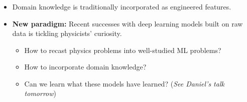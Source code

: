 \documentclass{beamer}
\begin{document}
\begin{frame}
    \frametitle{}
    \begin{itemize}
        \item Domain knowledge is traditionally incorporated as engineered features.

        \vspace{1cm}

        \item {\bf New paradigm:} Recent successes with deep learning models built on raw data is tickling physicists' curiosity.
            \begin{itemize}
                \item How to recast physics problems into well-studied ML problems?
                \item How to incorporate domain knowledge?
                \item Can we learn what these models have learned? ({\it See Daniel's talk tomorrow})
            \end{itemize}
    \end{itemize}
\end{frame}
\end{document}
